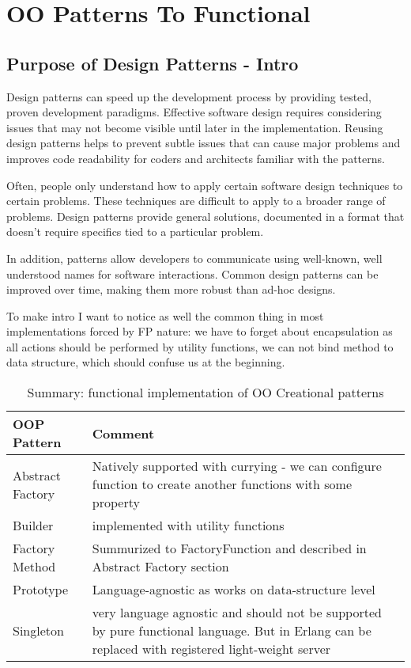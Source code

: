 \chapter{OO Patterns To Functional}

\section{Purpose of Design Patterns - Intro}

Design patterns can speed up the development process by providing tested, proven development paradigms. Effective software design requires considering issues that may not become visible until later in the implementation. Reusing design patterns helps to prevent subtle issues that can cause major problems and improves code readability for coders and architects familiar with the patterns.

Often, people only understand how to apply certain software design techniques to certain problems. These techniques are difficult to apply to a broader range of problems. Design patterns provide general solutions, documented in a format that doesn't require specifics tied to a particular problem.

In addition, patterns allow developers to communicate using well-known, well understood names for software interactions. Common design patterns can be improved over time, making them more robust than ad-hoc designs.

To make intro I want to notice as well the common thing in most implementations forced by FP nature: we have to forget about encapsulation as all actions should be performed by utility functions, we can not bind method to data structure, which should confuse us at the beginning.


\begin{table}
    \begin{tabular}{ | l | p{10cm} |}
        \hline
        \hline
        OOP Pattern & Comment \\
        \hline
        \hline
            \cellcolor{green} Abstract Factory  & Natively supported with currying - we can configure function to create another functions with some property \\ \hline
            \cellcolor{green} Builder  & implemented with utility functions \\ \hline
            \cellcolor{green} Factory Method  & Summurized to FactoryFunction and described in Abstract Factory section \\ \hline
            \cellcolor{green} Prototype & Language-agnostic as works on data-structure level \\ \hline
            \cellcolor{green} Singleton  & very language agnostic and should not be supported by pure functional language. But in Erlang can be replaced with registered light-weight server \\ \hline
        \hline
    \end{tabular}
    \caption{Summary: functional implementation of OO Creational patterns}
\end{table}

